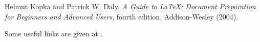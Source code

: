 \begin{thebibliography}
		
		Helmut Kopka and Patrick W. Daly, \textsl{A Guide to
			\LaTeX: Document Preparation for Beginners and Advanced Users},
		fourth edition, Addison-Wesley (2004).
		
		Some useful links are
		given at \url{}.
		
\end{thebibliography}